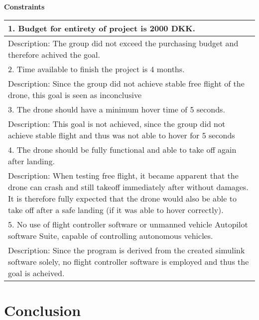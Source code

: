 \begin{center}
  \bigbreak
  \textbf{Constraints} 
  \bigbreak

  \begin{tabular}{| m{33em} |}
      \hline
      \color{ForestGreen}
      1. Budget for entirety of project is 2000 DKK.  \\ 
      \hline
      Description:  The group did not exceed the purchasing budget and therefore achived the goal.\\ 
      \hline
      \hline
      \color{YellowOrange}
      2. Time available to finish the project is 4 months. \\ 
      \hline
      Description:  Since the group did not achieve stable free flight of the drone, this goal is seen as inconclusive\\ 
      \hline
      \hline
      \color{BrickRed}
      3. The drone should have a minimum hover time of 5 
      seconds.\\
      \hline
      Description:   This goal is not achieved, since the group did not achieve stable flight and thus was not able to hover for 5 seconds\\ 
      \hline
      \hline
      \color{ForestGreen}
      4. The drone should be fully functional and able 
      to take off again after landing.\\
      \hline
      Description: When testing free flight, it became apparent that the drone can crash and still takeoff immediately after without damages. It is therefore fully 
      expected that the drone would also be able to take off after a safe landing (if it was able to hover correctly).\\ 
      \hline
      \hline
      \color{ForestGreen}
      5. No use of flight controller software or unmanned 
      vehicle Autopilot software Suite, capable of 
      controlling autonomous vehicles.\\
      \hline
      Description:  Since the program is derived from the created simulink software solely, no flight controller software is employed and thus the goal is acheived. \\ 
      \hline
  \end{tabular}

\end{center}    

\section{Conclusion}

